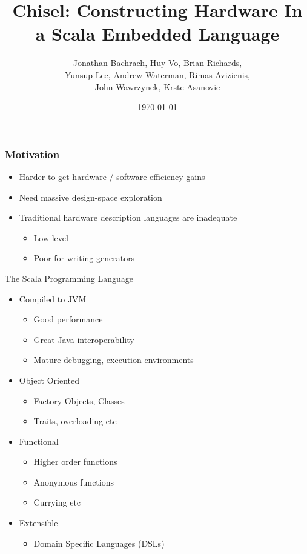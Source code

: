 \documentclass[xcolor=pdflatex,dvipsnames,table]{beamer}
\title{Chisel: Constructing Hardware In a Scala Embedded Language}
\author[Jonathan Bachrach et al]{Jonathan Bachrach, Huy Vo, Brian Richards, \\
Yunsup Lee, Andrew Waterman, Rimas Avizienis, \\
John Wawrzynek, Krste Asanovic}
\date{\today}
\institute[UC Berkeley]{EECS UC Berkeley}
\begin{document}
\begin{frame}
\titlepage
\end{frame}

\begin{frame}[fragile]
\frametitle{Motivation}
\begin{itemize}
\item Harder to get hardware / software efficiency gains
\item Need massive design-space exploration
\item Traditional hardware description languages are inadequate
\begin{itemize}
\item Low level
\item Poor for writing generators
\end{itemize}
\end{itemize}
\end{frame}

\begin{frame}[fragile]{The Scala Programming Language}
\begin{itemize}
\item Compiled to JVM
\begin{itemize}
\item Good performance
\item Great Java interoperability
\item Mature debugging, execution environments
\end{itemize}
\item Object Oriented
\begin{itemize}
\item Factory Objects, Classes
\item Traits, overloading etc
\end{itemize}
\item Functional
\begin{itemize}
\item Higher order functions
\item Anonymous functions
\item Currying etc
\end{itemize}
\item Extensible
\begin{itemize}
\item Domain Specific Languages (DSLs)
\end{itemize}
\end{itemize}
\end{frame}
\end{document}
